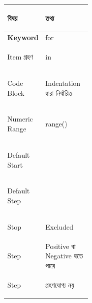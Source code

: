 \begin{tabularx}
{\linewidth}
{
|>{\bfseries\RaggedRight\arraybackslash}p{0.34\linewidth}
|Y|
}

\hline
{}

\textbf{বিষয়}
&
\textbf{তথ্য}
\\
\hline

Keyword
&
\textenglish{\ttfamily for}
\\
\hline

Item গ্রহণ
&
\textenglish{\ttfamily in}
\\
\hline

Code Block
&
Indentation দ্বারা নির্ধারিত
\\
\hline

Numeric Range
&
\textenglish{\ttfamily range()}
\\
\hline

Default Start
&
\textenglish{}
\\
\hline

Default Step
&
\textenglish{}
\\
\hline

Stop
&
Excluded
\\
\hline

Step
&
Positive বা Negative হতে পারে
\\
\hline

Step
\textenglish{}
&
গ্রহণযোগ্য নয়
\\
\hline

\end{tabularx}



